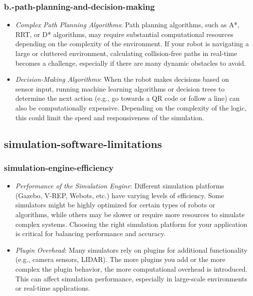\documentclass[../../main]{subfiles}
\begin{document}
    \subsubsection{b.-path-planning-and-decision-making}
    \begin{itemize}
    \item
      \emph{Complex Path Planning Algorithms}: Path planning algorithms,
      such as A*, RRT, or D* algorithms, may require substantial
      computational resources depending on the complexity of the
      environment. If your robot is navigating a large or cluttered
      environment, calculating collision-free paths in real-time becomes a
      challenge, especially if there are many dynamic obstacles to avoid.
    \item
      \emph{Decision-Making Algorithms}: When the robot makes decisions
      based on sensor input, running machine learning algorithms or decision
      trees to determine the next action (e.g., go towards a QR code or
      follow a line) can also be computationally expensive. Depending on the
      complexity of the logic, this could limit the speed and responsiveness
      of the simulation.
    \end{itemize}
    
    \subsection{simulation-software-limitations}
    
    \subsubsection{simulation-engine-efficiency}
    \begin{itemize}
    \item
      \emph{Performance of the Simulation Engine}: Different simulation
      platforms (Gazebo, V-REP, Webots, etc.) have varying levels of
      efficiency. Some simulators might be highly optimized for certain
      types of robots or algorithms, while others may be slower or require
      more resources to simulate complex systems. Choosing the right
      simulation platform for your application is critical for balancing
      performance and accuracy.
    \item
      \emph{Plugin Overhead}: Many simulators rely on plugins for
      additional functionality (e.g., camera sensors, LIDAR). The more
      plugins you add or the more complex the plugin behavior, the more
      computational overhead is introduced. This can affect simulation
      performance, especially in large-scale environments or real-time
      applications.
    \end{itemize}
    
\end{document}
